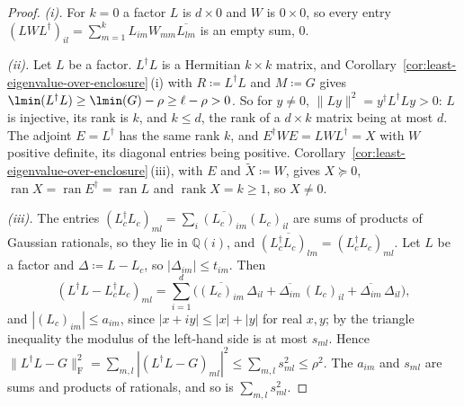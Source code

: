\begin{proof}
\emph{(i).} For $k=0$ a factor $L$ is $d\times0$ and $W$ is $0\times0$, so
every entry $(LWL^{\dagger})_{il}=\sum_{m=1}^{k}L_{im}W_{mm}\overline{L_{lm}}$
is an empty sum, $0$.

\emph{(ii).} Let $L$ be a factor. $L^{\dagger}L$ is a Hermitian $k\times k$
matrix, and Corollary~\ref{cor:least-eigenvalue-over-enclosure}\,(i) with
$R\coloneqq L^{\dagger}L$ and $M\coloneqq G$ gives
$\lmin(L^{\dagger}L)\ge\lmin(G)-\rho\ge\ell-\rho>0$. So for $y\ne0$,
$\|Ly\|^{2}=y^{\dagger}L^{\dagger}Ly>0$: $L$ is injective, its rank is $k$,
and $k\le d$, the rank of a $d\times k$ matrix being at most $d$. The adjoint
$E=L^{\dagger}$ has the same rank $k$, and $E^{\dagger}WE=LWL^{\dagger}=X$
with $W$ positive definite, its diagonal entries being positive.
Corollary~\ref{cor:least-eigenvalue-over-enclosure}\,(iii), with $E$ and
$\widetilde X\coloneqq W$, gives $X\succeq0$,
$\operatorname{ran}X=\operatorname{ran}E^{\dagger}=\operatorname{ran}L$ and
$\operatorname{rank}X=k\ge1$, so $X\ne0$.

\emph{(iii).} The entries $(L_c^{\dagger}L_c)_{ml}=\sum_i
\overline{(L_c)_{im}}(L_c)_{il}$ are sums of products of Gaussian rationals,
so they lie in $\mathbb{Q}(i)$, and
$\overline{(L_c^{\dagger}L_c)_{lm}}=(L_c^{\dagger}L_c)_{ml}$. Let $L$ be a
factor and $\Delta\coloneqq L-L_c$, so $|\Delta_{im}|\le t_{im}$. Then
\begin{equation*}
  (L^{\dagger}L-L_c^{\dagger}L_c)_{ml}
  =\sum_{i=1}^{d}\Big(\overline{(L_c)_{im}}\,\Delta_{il}
  +\overline{\Delta_{im}}\,(L_c)_{il}+\overline{\Delta_{im}}\,\Delta_{il}\Big),
\end{equation*}
and $|(L_c)_{im}|\le a_{im}$, since $|x+iy|\le|x|+|y|$ for real $x,y$; by the
triangle inequality the modulus of the left-hand side is at most $s_{ml}$.
Hence $\|L^{\dagger}L-G\|_{\mathrm F}^{2}=\sum_{m,l}|(L^{\dagger}L-G)_{ml}|^{2}
\le\sum_{m,l}s_{ml}^{2}\le\rho^{2}$. The $a_{im}$ and $s_{ml}$ are sums and
products of rationals, and so is $\sum_{m,l}s_{ml}^{2}$.
\end{proof}
